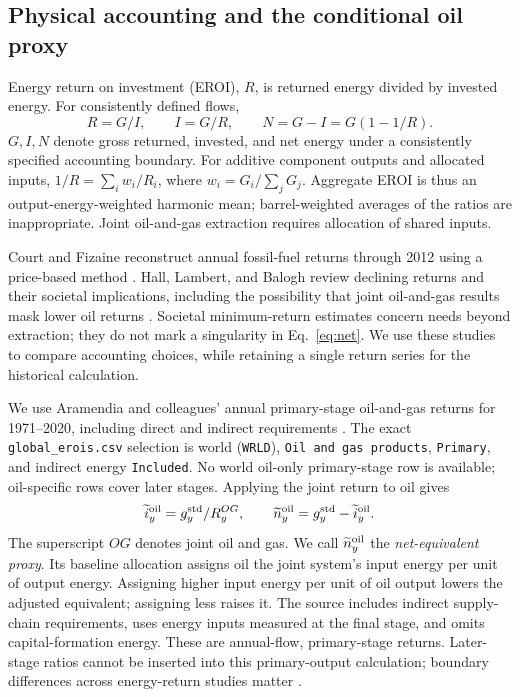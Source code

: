 \documentclass[reprint,aps,pra,longbibliography,floatfix]{revtex4-2}
\begin{document}
\subsection{Physical accounting and the conditional oil proxy}
Energy return on investment (EROI), $R$, is returned energy divided by invested energy. For consistently defined flows,
\begin{equation}
 R=G/I,\qquad I=G/R,\qquad N=G-I=G(1-1/R).
 \label{eq:net}
\end{equation}
$G,I,N$ denote gross returned, invested, and net energy under a consistently specified accounting boundary. For additive component outputs and allocated inputs, $1/R=\sum_i w_i/R_i$, where $w_i=G_i/\sum_jG_j$. Aggregate EROI is thus an output-energy-weighted harmonic mean; barrel-weighted averages of the ratios are inappropriate. Joint oil-and-gas extraction requires allocation of shared inputs.

Court and Fizaine reconstruct annual fossil-fuel returns through 2012 using a price-based method \citep{courtFizaine2017}. Hall, Lambert, and Balogh review declining returns and their societal implications, including the possibility that joint oil-and-gas results mask lower oil returns \citep{hallLambertBalogh2014}. Societal minimum-return estimates concern needs beyond extraction; they do not mark a singularity in Eq.~\eqref{eq:net}. We use these studies to compare accounting choices, while retaining a single return series for the historical calculation.

We use Aramendia and colleagues' annual primary-stage oil-and-gas returns for 1971--2020, including direct and indirect requirements \citep{aramendia2024,aramendiaData}. The exact \texttt{global\_erois.csv} selection is world (\texttt{WRLD}), \texttt{Oil and gas products}, \texttt{Primary}, and indirect energy \texttt{Included}. No world oil-only primary-stage row is available; oil-specific rows cover later stages. Applying the joint return to oil gives
\begin{equation}
 \widetilde i_y^{\rm oil}=g_y^{\rm std}/R_y^{OG},\qquad
 \widetilde n_y^{\rm oil}=g_y^{\rm std}-\widetilde i_y^{\rm oil}.
 \label{eq:proxy}
\end{equation}
The superscript $OG$ denotes joint oil and gas. We call $\widetilde n_y^{\rm oil}$ the \emph{net-equivalent proxy}. Its baseline allocation assigns oil the joint system's input energy per unit of output energy. Assigning higher input energy per unit of oil output lowers the adjusted equivalent; assigning less raises it. The source includes indirect supply-chain requirements, uses energy inputs measured at the final stage, and omits capital-formation energy. These are annual-flow, primary-stage returns. Later-stage ratios cannot be inserted into this primary-output calculation; boundary differences across energy-return studies matter \citep{brockway2019,brandt2015}.
\end{document}
